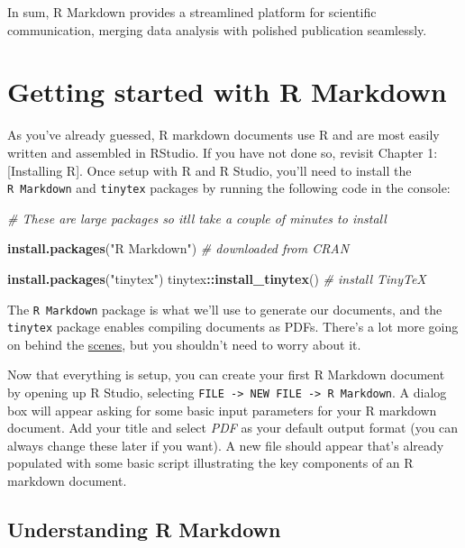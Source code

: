 \documentclass[
]{book}
\newenvironment{Shaded}{\begin{snugshade}}{\end{snugshade}}
\newcommand{\CommentTok}[1]{\textcolor[rgb]{0.56,0.35,0.01}{\textit{#1}}}
\newcommand{\FunctionTok}[1]{\textcolor[rgb]{0.13,0.29,0.53}{\textbf{#1}}}
\newcommand{\NormalTok}[1]{#1}
\newcommand{\SpecialCharTok}[1]{\textcolor[rgb]{0.81,0.36,0.00}{\textbf{#1}}}
\newcommand{\StringTok}[1]{\textcolor[rgb]{0.31,0.60,0.02}{#1}}
\begin{document}
In sum, R Markdown provides a streamlined platform for scientific communication, merging data analysis with polished publication seamlessly.

\hypertarget{getting-started-with-r-markdown}{%
\section{Getting started with R Markdown}\label{getting-started-with-r-markdown}}

As you've already guessed, R markdown documents use R and are most easily written and assembled in RStudio. If you have not done so, revisit Chapter 1:{[}Installing R{]}. Once setup with R and R Studio, you'll need to install the \texttt{R\ Markdown} and \texttt{tinytex} packages by running the following code in the console:

\begin{Shaded}
\begin{Highlighting}[]
\CommentTok{\# These are large packages so it\textquotesingle{}ll take a couple of minutes to install}

\FunctionTok{install.packages}\NormalTok{(}\StringTok{"R Markdown"}\NormalTok{) }\CommentTok{\# downloaded from CRAN}

\FunctionTok{install.packages}\NormalTok{(}\StringTok{"tinytex"}\NormalTok{)}
\NormalTok{tinytex}\SpecialCharTok{::}\FunctionTok{install\_tinytex}\NormalTok{()  }\CommentTok{\# install TinyTeX}
\end{Highlighting}
\end{Shaded}

The \texttt{R\ Markdown} package is what we'll use to generate our documents, and the \texttt{tinytex} package enables compiling documents as PDFs. There's a lot more going on behind the \href{https://R\%20Markdown.rstudio.com/lesson-2.html}{scenes}, but you shouldn't need to worry about it.

Now that everything is setup, you can create your first R Markdown document by opening up R Studio, selecting \texttt{FILE\ -\textgreater{}\ NEW\ FILE\ -\textgreater{}\ R\ Markdown}. A dialog box will appear asking for some basic input parameters for your R markdown document. Add your title and select \emph{PDF} as your default output format (you can always change these later if you want). A new file should appear that's already populated with some basic script illustrating the key components of an R markdown document.

\hypertarget{understanding-r-markdown}{%
\subsection{Understanding R Markdown}\label{understanding-r-markdown}}
\end{document}
